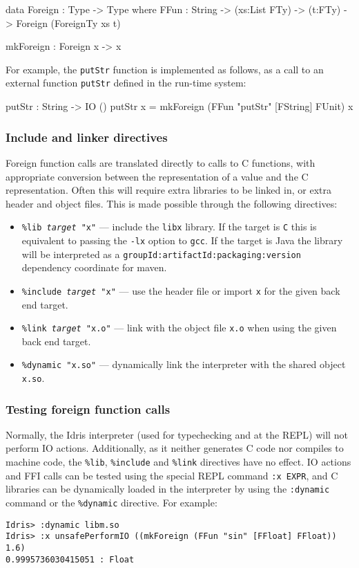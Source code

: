 \begin{code}
data Foreign : Type -> Type where
    FFun : String -> (xs:List FTy) -> (t:FTy) -> 
           Foreign (ForeignTy xs t)

mkForeign : Foreign x -> x
\end{code}

\noindent
For example, the \texttt{putStr} function is implemented as follows, as a call to  an external function \texttt{putStr} defined in the run-time system:

\begin{code}
putStr : String -> IO ()
putStr x = mkForeign (FFun "putStr" [FString] FUnit) x
\end{code}

\subsubsection*{Include and linker directives}

Foreign function calls are translated directly to calls to C functions, with appropriate conversion between the \Idris{} representation of a value and the C representation.
Often this will require extra libraries to be linked in, or extra header and object files.
This is made possible through the following directives:

\begin{itemize}
\item \texttt{\%lib \emph{target} "x"} --- include the \texttt{libx} library.
If the target is \texttt{C} this is equivalent to passing the \texttt{-lx} option to \texttt{gcc}.
If the target is Java the library will be interpreted as a \texttt{groupId\-:artifactId\-:packaging:version} dependency coordinate for maven.
\item \texttt{\%include \emph{target} "x"} --- use the header file or import \texttt{x} for the given back end target.
\item \texttt{\%link \emph{target} "x.o"} --- link with the object file \texttt{x.o} when using the given back end target.
\item \texttt{\%dynamic "x.so"} --- dynamically link the interpreter with the shared object \texttt{x.so}.
\end{itemize}

\subsubsection*{Testing foreign function calls}
Normally, the Idris interpreter (used for typechecking and at the REPL) will not perform IO actions.
Additionally, as it neither generates C code nor compiles to machine code, the \texttt{\%lib}, \texttt{\%include} and \texttt{\%link} directives have no effect.
IO actions and FFI calls can be tested using the special REPL command \texttt{:x EXPR}, and C libraries can be dynamically loaded in the interpreter by using the \texttt{:dynamic} command or the \texttt{\%dynamic} directive.
For example:

\begin{lstlisting}
Idris> :dynamic libm.so
Idris> :x unsafePerformIO ((mkForeign (FFun "sin" [FFloat] FFloat)) 1.6)
0.9995736030415051 : Float
\end{lstlisting}

